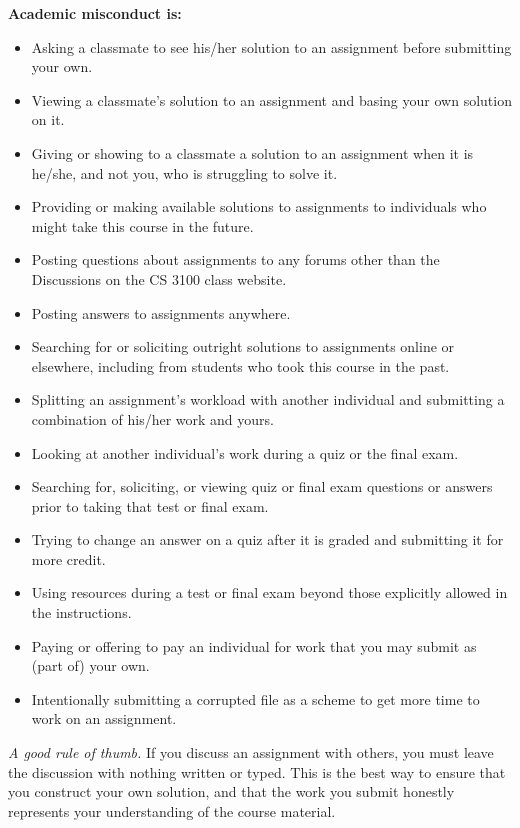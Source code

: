 \documentclass[11pt]{article}
\begin{document}
{\bf Academic misconduct is:}
\begin{itemize}\vspace{-.15in}
\item Asking a classmate to see his/her solution to an assignment before submitting your own.
\item Viewing a classmate's solution to an assignment and basing your own solution on it.
\item Giving or showing to a classmate a solution to an assignment when it is he/she, and not you, who is struggling to solve it.
\item Providing or making available solutions to assignments to individuals who might take this course in the future.
\item Posting questions about assignments to any forums other than the Discussions on the CS 3100 class website.
\item Posting answers to assignments anywhere.
\item Searching for or soliciting outright solutions to assignments online or elsewhere, including from students who took this course in the past.
\item Splitting an assignment's workload with another individual and submitting a combination of
his/her work and yours.
\item Looking at another individual's work during a quiz or the final exam.
\item Searching for, soliciting, or viewing quiz or final exam questions or answers prior to taking that test or final exam.
\item Trying to change an answer on a quiz after it is graded and submitting it for more credit.
\item Using resources during a test or final exam beyond those explicitly allowed in the instructions.
\item Paying or offering to pay an individual for work that you may submit as (part of) your own.
\item Intentionally submitting a corrupted file as a scheme to get more time to work on an assignment.
\end{itemize}

{\em A good rule of thumb.} If you discuss an assignment with others, you must leave the discussion with nothing written or typed. This is the best way to ensure that you construct your own solution, and that the work you submit honestly represents your understanding of the course material.
\end{document}

